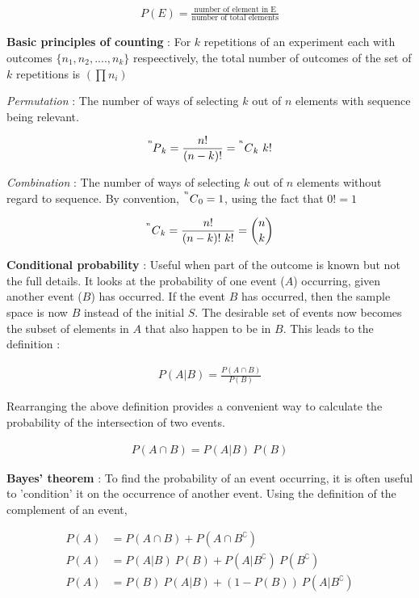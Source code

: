 \begin{align}
	P(E) = \frac{\text{number of element in E}}{\text{number of total elements}}
\end{align}

\textbf{Basic principles of counting} : For $ k $ repetitions of an experiment each with outcomes $ \{ n_1, n_2, ...., n_k \} $ respeectively, the total number of outcomes of the set of $ k $ repetitions is $ \left( \prod n_i  \right)$ 

\textit{Permutation} : The number of ways of selecting $ k $ out of $ n $ elements with sequence being relevant.

\begin{align}
	\prescript{^n\mkern-2.5mu}{}P_{k} = \frac{n!}{(n-k)!} = \prescript{^n\mkern-0.5mu}{}C_{k} \ k! 
\end{align}

\textit{Combination} : The number of ways of selecting $ k $ out of $ n $ elements without regard to sequence. By convention, $ \prescript{^n\mkern-0.5mu}{}C_{0} = 1 $, using the fact that $ 0! = 1 $

\begin{align}
	\prescript{^n\mkern-0.5mu}{}C_{k} = \frac{n!}{(n-k)! \ k!} = \binom{n}{k}
\end{align}

\textbf{Conditional probability} : Useful when part of the outcome is known but not the full details. It looks at the probability of one event ($ A $) occurring, given another event ($ B $) has occurred. If the event $ B $ has occurred, then the sample space is now $ B $ instead of the initial $ S $. The desirable set of events now becomes the subset of elements in $ A $ that also happen to be in $ B $. This leads to the definition :

\begin{align}
	P(A|B) = \frac{P(A \cap B)}{P(B)}
\end{align}

Rearranging the above definition provides a convenient way to calculate the probability of the intersection of two events. 

\begin{align}
	P(A \cap B) = P(A|B)\ P(B)
\end{align}

\textbf{Bayes' theorem} : To find the probability of an event occurring, it is often useful to 'condition' it on the occurrence of another event. Using the definition of the complement of an event, 

\begin{align}
	P(A) &= P(A \cap B) + P(A \cap B^\complement) \\
	P(A) &= P(A|B)\ P(B) + P(A|B^\complement)\ P(B^\complement)\\
	P(A) &= P(B) \ P(A|B) + (1 - P(B))\ P(A|B^\complement)
\end{align}

